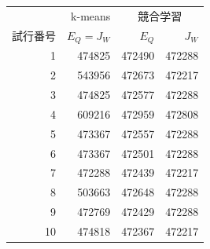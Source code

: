 \documentclass[a4j]{jarticle}
\begin{document}
\begin{table}[h]
 \begin{center}
  \begin{tabular}{|r||r|r|r|} \hline
            & k-means     & \multicolumn{2}{|c|}{競合学習} \\ \cline{2-4}
   試行番号 & $E_Q = J_W$                  & $E_Q$  & $J_W$  \\ \hline \hline
          1 &                       474825 & 472490 & 472288 \\ \hline
          2 & \cellcolor[gray]{0.8} 543956 & 472673 & 472217 \\ \hline
          3 &                       474825 & 472577 & 472288 \\ \hline
          4 & \cellcolor[gray]{0.8} 609216 & 472959 & 472808 \\ \hline
          5 &                       473367 & 472557 & 472288 \\ \hline
          6 &                       473367 & 472501 & 472288 \\ \hline
          7 &                       472288 & 472439 & 472217 \\ \hline
          8 & \cellcolor[gray]{0.8} 503663 & 472648 & 472288 \\ \hline
          9 &                       472769 & 472429 & 472288 \\ \hline
         10 &                       474818 & 472367 & 472217 \\ \hline
  \end{tabular}
 \end{center}
\end{table}
\end{document}
